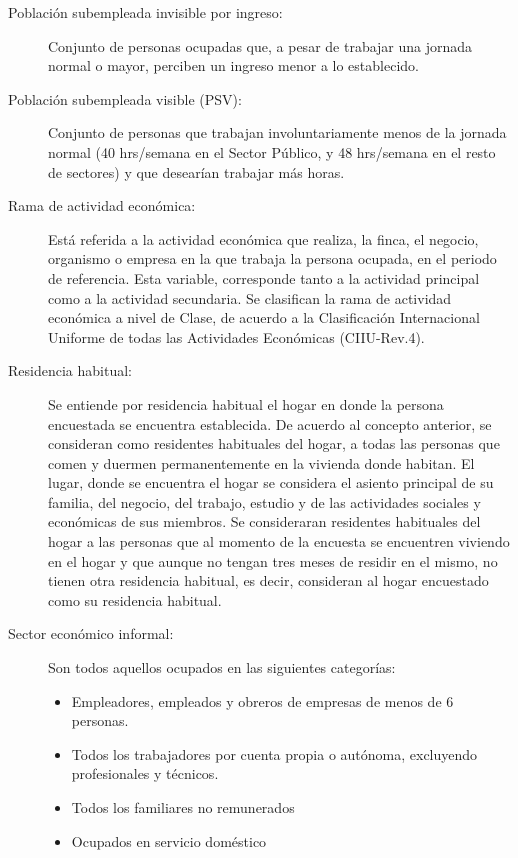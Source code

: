 \begin{description}
	\item[Población subempleada invisible por ingreso:] Conjunto de personas ocupadas que, a pesar de trabajar una jornada normal o mayor, perciben un ingreso menor a lo establecido.
	
	\item[Población subempleada visible (PSV):] Conjunto de personas que trabajan involuntariamente menos de la jornada normal (40 hrs/semana en el Sector Público, y 48 hrs/semana en el resto de sectores) y que desearían trabajar más horas.
	
	\item[Rama de actividad económica:] Está referida a la actividad económica que realiza, la finca, el negocio, organismo o empresa en la que trabaja la persona ocupada, en el periodo de referencia. Esta variable, corresponde tanto a la actividad principal como a la actividad secundaria. Se clasifican la rama de actividad económica a nivel de Clase, de acuerdo a la Clasificación Internacional Uniforme de todas las Actividades Económicas (CIIU-Rev.4).
	\item[Residencia habitual:] Se entiende por residencia habitual el hogar en donde la persona encuestada se encuentra establecida. De acuerdo al concepto anterior, se consideran como residentes habituales del hogar, a todas las personas que comen y duermen permanentemente en la vivienda donde habitan. El lugar, donde se encuentra el hogar se considera el asiento principal de su familia, del negocio, del trabajo, estudio y de las actividades sociales y económicas de sus miembros.
	Se consideraran residentes habituales del hogar a las personas que al momento de la encuesta se encuentren viviendo en el hogar y que aunque no tengan tres meses de residir en el mismo, no tienen otra residencia habitual, es decir, consideran al hogar encuestado como su residencia habitual.
	\item[Sector económico informal:] Son todos aquellos ocupados en las siguientes categorías:
	\begin{itemize}\itemsep -1pt
		\item	Empleadores, empleados y obreros de empresas de menos de 6 personas.
		\item	Todos los trabajadores por cuenta propia o autónoma, excluyendo profesionales y técnicos. 
		\item	Todos los familiares no remunerados
		\item	Ocupados en servicio doméstico
	\end{itemize}
	

\end{description}
